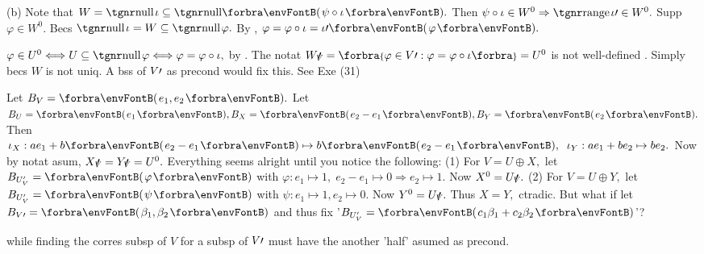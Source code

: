 (b) \Or Note that $W=\null{\iota}\subseteq\Null\Par{\psi\circ\iota}.$ Then $\psi\circ\iota\in W^0\Rightarrow\range\iota\apostrophe\in W^0.$\parSol{\Hb}
\Blind{\Or}Supp $\varphi\in W^0.$ Becs $\null\iota=W\subseteq\null\varphi.$ By , $\varphi=\varphi\circ\iota=\iota\apostrophe\Par{\varphi}.$\PfEnd
\SepLine

$\varphi\in U^0\Longleftrightarrow U\subseteq\null\varphi\Longleftrightarrow\varphi=\varphi\circ\iota,$ by .\PfEnd\vspace{3pt}
\ANote The notat $W_V\upapostrophe=\Bra{\varphi\in V\apostrophe:\varphi=\varphi\circ\iota}=U^0$ is not well-defined .\parNot
Simply becs $W$ is not uniq. A bss of $V\prime$ as precond would fix this. See {\NOTEFOR} Exe (31)\par\vspace{2pt}
\AExa Let $B_V=\Par{e_1,e_2}.$ Let $B_U=\Par{e_1},B_X=\Par{e_2-e_1},B_Y=\Par{e_2}.$\parExa
Then $\iota_X:ae_1+b\Par{e_2-e_1}\mapsto b\Par{e_2-e_1},\;\;\iota_Y:ae_1+be_2\mapsto be_2.$ Now by notat asum, $X_V\!\!\!\prime\,=Y_V\!\!\!\prime\,=U^0.$\parExa
Everything seems alright until you notice the following:\parExa
(1) For $V=U\oplus X,$ let $B_{U_V'}=\Par{\varphi}$ with $\varphi:e_1\mapsto 1,\;e_2-e_1\mapsto 0\Rightarrow e_2\mapsto 1.$ \hfill Now $X^0=U_V\!\!\!\prime\,.$\parExa
(2) For $V=U\oplus Y,$ let $B_{U_V'}=\Par{\psi}$ with $\psi:e_1\mapsto 1,e_2\mapsto 0.$ \hfill Now $Y^0=U_V\!\!\!\prime\,.$\parExa
Thus $X=Y,$ ctradic. But what if let $B_{V\apostrophe}=\Par{\beta_1,\beta_2}$ and thus fix '$B_{U_V'}=\Par{c_1\beta_1+c_2\beta_2}$'? \par\vspace{2pt}
\vspace{-3pt}\parCom
{\tgsl\normalsize while finding the corres subsp of $V$ for a subsp of $V\prime$ must have the another 'half' asumed as precond.}
\SepLine\pagebreak

